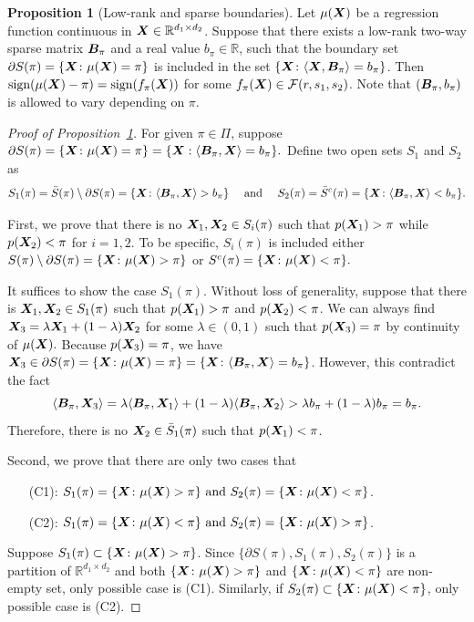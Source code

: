 \documentclass[11pt]{article}
\theoremstyle{plain}
\theoremstyle{definition}
\newtheorem{prop}{Proposition}
\def\sign{\textup{sign}}
\begin{document}
\begin{prop}[Low-rank and sparse boundaries]\label{prop:px} Let $\mu(\bm X)$ be a regression function continuous in $\bm X\in\mathbb{R}^{d_1\times d_2}$. Suppose that there exists a low-rank two-way sparse matrix $\bm B_\pi$ and a real value $b_\pi\in\mathbb{R}$, such that the boundary set $\partial S(\pi)=\{\bm X\colon \mu(\bm X)=\pi\}$ is included in the set $\{\bm X\colon \langle \bm X, \bm B_\pi \rangle = b_\pi\}$. Then $\sign (\mu(\mX)-\pi)=\sign (f_\pi(\mX))$ for some $f_\pi(\bm X)\in \mathcal{F}(r,s_1,s_2)$. Note that $(\bm B_\pi, b_\pi)$ is allowed to vary depending on $\pi$. 
\end{prop}

\begin{proof}[Proof of Proposition~\ref{prop:px}]
For given $\pi\in\Pi$, suppose $\partial S(\pi) = \{\bm X\colon \mu(\bm X) = \pi\} = \{\bm X:\langle \bm B_\pi,\bm X\rangle = b_\pi\}.$
Define two open sets $S_1$ and $S_2$ as 
\begin{align}
S_1(\pi) = \bar S(\pi)\setminus \partial S(\pi) = \{\bm X\colon \langle \bm B_\pi,\bm X\rangle >b_\pi\}\quad\text{ and }\quad S_2(\pi) = \bar S^c(\pi) = \{\bm X\colon \langle \bm B_\pi,\bm X\rangle < b_\pi\}.
\end{align}

First, we prove that there is no $\bm X_1,\bm X_2\in S_i(\pi)$ such that $p(\bm X_1)>\pi$ while $p(\bm X_2)<\pi$ for $i = 1, 2.$ To be specific, $S_i(\pi)$ is included either $S(\pi)\setminus\partial S(\pi) = \{\bm X\colon \mu(\bm X)>\pi\}$ or $S^c(\pi) = \{\bm X\colon \mu(\bm X)<\pi\}.$ 

It suffices to show the case $S_1(\pi)$.
Without loss of generality, suppose that there is $\bm X_1,\bm X_2\in S_1(\pi) $ such that $p(\bm X_1)>\pi$ and $p(\bm X_2)<\pi$. 
We can always find $\bm X_3 = \lambda \bm X_1+(1-\lambda)\bm X_2$ for some $\lambda\in(0,1)$ such that $p(\bm X_3) = \pi$ by continuity of $\mu(\bm X).$ Because $p(\bm X_3) = \pi$, we have  $\bm X_3\in \partial S(\pi) = \{\bm X\colon \mu(\bm X) = \pi\} =  \{\bm X\colon\langle \bm B_\pi,\bm X\rangle = b_\pi\}$. However, this contradict the fact \[\langle \bm B_\pi,\bm X_3\rangle =\lambda \langle \bm B_\pi,\bm X_1\rangle + (1-\lambda)\langle \bm B_\pi,\bm X_2\rangle> \lambda b_\pi+(1-\lambda)b_\pi = b_\pi. \]
Therefore, there is no $\bm X_2\in\bar S_1(\pi)$ such that $p(\bm X_1)<\pi$. 

Second, we prove that there are only two cases that 
\begin{enumerate}
    \item[(C1):]$S_1(\pi) = \{\bm X\colon \mu(\bm X) >\pi\} \text{ and } S_2(\pi) = \{\bm X\colon \mu(\bm X) <\pi\}$.
    \item[(C2):]$S_1(\pi) = \{\bm X\colon \mu(\bm X) <\pi\} \text{ and } S_2(\pi) = \{\bm X\colon \mu(\bm X) >\pi\}$.
\end{enumerate}
Suppose $S_1(\pi)\subset \{\bm X\colon \mu(\bm X)>\pi\}$. Since $\{\partial S(\pi),S_1(\pi),S_2(\pi)\}$ is a partition of $\mathbb{R}^{d_1\times d_2}$ and both $\{\bm X\colon \mu(\bm X)>\pi\}$ and $\{\bm X\colon \mu(\bm X)<\pi\}$ are non-empty set, only possible case is (C1). Similarly, if $S_2(\pi) \subset\{\bm X\colon \mu(\bm X)<\pi\}$, only possible case is (C2).


\end{proof}
\end{document}
